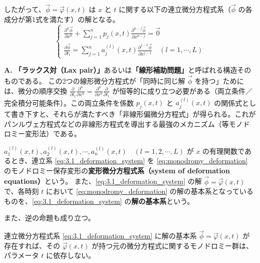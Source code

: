 したがって、$\vec{\phi}=\vec{\varphi}(x,t)$ は $x$ と $t$ に関する以下の連立微分方程式系（$\vec{\phi}$ の各成分が第1式を満たす）の解となる。
\begin{equation}\label{eq:3.1_deformation_system}
\begin{cases}
\displaystyle \frac{\partial^{n}\vec{\phi}}{\partial x^{n}} + \sum_{j=1}^{n} p_{j}(x,t)\frac{\partial^{n-j}\vec{\phi}}{\partial x^{n-j}} = \vec{0}  \\[1em]
\displaystyle \frac{\partial \vec{\phi}}{\partial t_{l}} = \sum_{j=1}^{n}a_{j}^{(l)}(x,t)\frac{\partial^{j-1}\vec{\phi}}{\partial x^{j-1}} \quad (l=1,\cdots,L)
\end{cases}
\end{equation}

\begin{Q}
\textbf{A.} \textbf{「ラックス対（Lax pair）」}あるいは\textbf{「線形補助問題」}と呼ばれる構造そのものである。
この2つの線形微分方程式が「同時に同じ解 $\vec{\phi}$ を持つ」ためには、微分の順序交換 $\frac{\partial}{\partial t_l} \frac{\partial^n}{\partial x^n} = \frac{\partial^n}{\partial x^n} \frac{\partial}{\partial t_l}$ が恒等的に成り立つ必要がある（両立条件／完全積分可能条件）。この両立条件を係数 $p_j(x,t)$ と $a_j^{(l)}(x,t)$ の関係式として書き下すと、それらが満たすべき「非線形偏微分方程式」が得られる。これがパンルヴェ方程式などの非線形方程式を導出する最強のメカニズム（等モノドロミー変形法）である。
\end{Q}

\begin{definition}[変形微分方程式系]
    $a_{1}^{(l)}(x,t), a_{2}^{(l)}(x,t), \cdots, a_{n}^{(l)}(x,t) \quad (l=1,2,\cdots,L)$ が $x$ の有理関数であるとき、連立系 \eqref{eq:3.1_deformation_system} を \eqref{eq:monodromy_deformation} のモノドロミー保存変形の\textbf{変形微分方程式系（system of deformation equations）}という。
    また、\eqref{eq:3.1_deformation_system} の解 $\vec{\phi}=\vec{\varphi}(x,t)$ で、各時刻 $t$ において \eqref{eq:monodromy_deformation} の解の基本系となっているものを、\eqref{eq:3.1_deformation_system} の\textbf{解の基本系}という。
\end{definition}

また、逆の命題も成り立つ。
\begin{proposition}\label{prop:3.1_fundamental_system_preserves_monodromy}
連立微分方程式系 \eqref{eq:3.1_deformation_system} に解の基本系 $\vec{\phi}=\vec{\varphi}(x,t)$ が存在すれば、その $\vec{\varphi}(x,t)$ が持つ元の微分方程式に関するモノドロミー群は、パラメータ $t$ に依存しない。
\end{proposition}

